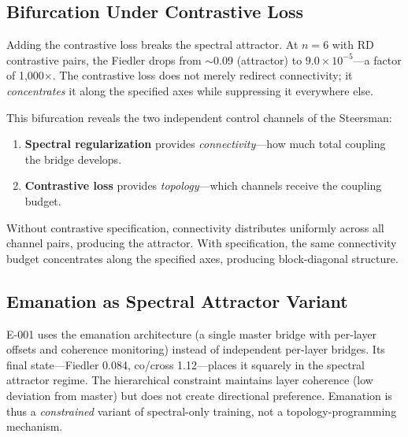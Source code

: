 \subsection{Bifurcation Under Contrastive Loss}

Adding the contrastive loss breaks the spectral attractor. At $n{=}6$ with
RD contrastive pairs, the Fiedler drops from $\sim$0.09 (attractor) to
$9.0 \times 10^{-5}$---a factor of 1{,}000$\times$. The contrastive loss
does not merely redirect connectivity; it \emph{concentrates} it along the
specified axes while suppressing it everywhere else.

This bifurcation reveals the two independent control channels of the
Steersman:
\begin{enumerate}
  \item \textbf{Spectral regularization} provides \emph{connectivity}---how
    much total coupling the bridge develops.
  \item \textbf{Contrastive loss} provides \emph{topology}---which channels
    receive the coupling budget.
\end{enumerate}

Without contrastive specification, connectivity distributes uniformly across
all channel pairs, producing the attractor. With specification, the same
connectivity budget concentrates along the specified axes, producing
block-diagonal structure.

\subsection{Emanation as Spectral Attractor Variant}

E-001 uses the emanation architecture (a single master bridge with per-layer
offsets and coherence monitoring) instead of independent per-layer bridges.
Its final state---Fiedler 0.084, co/cross 1.12---places it squarely in the
spectral attractor regime. The hierarchical constraint maintains layer
coherence (low deviation from master) but does not create directional
preference. Emanation is thus a \emph{constrained} variant of spectral-only
training, not a topology-programming mechanism.
